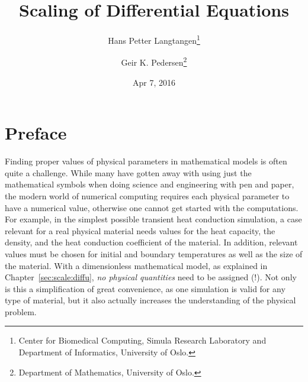 \documentclass[graybox,envcountchap,sectrefs,final]{svmonodo}
\begin{document}







\frontmatter
\setcounter{page}{3}
\pagestyle{headings}



\title{Scaling of Differential Equations}


\author{Hans Petter Langtangen\footnote{Center for Biomedical Computing, Simula Research Laboratory and Department of Informatics, University of Oslo.}
\and Geir K. Pedersen\footnote{Department of Mathematics, University of Oslo.}}


\date{Apr 7, 2016}
\maketitle


\chapter*{Preface}
\label{ch:preface}

Finding proper values of physical parameters in mathematical models is
often quite a challenge. While many have gotten away with using just
the mathematical symbols when doing science and engineering with pen
and paper, the modern world of numerical computing requires each
physical parameter to have a numerical value, otherwise one cannot get
started with the computations.  For example, in the simplest possible
transient heat conduction simulation, a case relevant for a real
physical material needs values for the heat capacity, the density, and
the heat conduction coefficient of the material. In addition, relevant
values must be chosen for initial and boundary temperatures as well as
the size of the material.  With a dimensionless mathematical model, as
explained in Chapter~\ref{sec:scale:diffu}, \emph{no physical quantities}
need to be assigned (!). Not only is this a simplification of great
convenience, as one simulation is valid for any type of material, but
it also actually increases the understanding of the physical problem.
\end{document}
